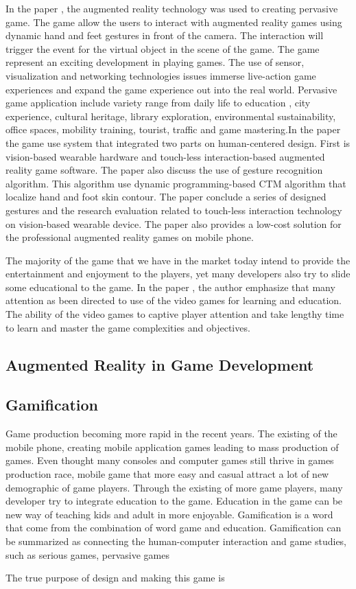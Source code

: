 \documentclass[12pt]{article}
\begin{document}
\par In the paper \cite{lv2015touch}, the augmented reality technology was used to creating pervasive game. The game allow the users to interact with augmented reality games using dynamic hand and feet gestures in front of the camera. The interaction will trigger the event for the virtual object in the scene of the game. The game represent an exciting development in playing games. The use of sensor, visualization and networking technologies issues immerse live-action game experiences and expand the game experience out into the real world. Pervasive game application include variety range from daily life to education , city experience, cultural heritage, library exploration, environmental sustainability, office spaces, mobility training, tourist, traffic and game mastering.In the paper the game use system that integrated two parts on human-centered design. First is vision-based wearable hardware and touch-less interaction-based augmented reality game software. The paper also discuss the use of gesture recognition algorithm. This algorithm use dynamic programming-based CTM algorithm that localize hand and foot skin contour.%
The paper conclude a series of designed gestures and the research evaluation related to touch-less interaction technology on vision-based wearable device. The paper also provides a low-cost solution for the professional augmented reality games on mobile phone.
\par The majority of the game that we have in the market today intend to provide the entertainment and enjoyment to the players, yet many developers also try to slide some educational to the game. In the paper \cite{dondlinger2007educational}, the author emphasize that many attention as been directed to use of the video games for learning and education. The ability of the video games to captive player attention and take lengthy time to learn and master the game complexities and objectives.

\subsection{Augmented Reality in Game Development}
\subsection{Gamification}
Game production becoming more rapid in the recent years. The existing of the mobile phone, creating mobile application games leading to mass production of games. Even thought many consoles and computer games still thrive in games production race, mobile game that more easy and casual attract a lot of new demographic of game players. Through the existing of more game players, many developer try to integrate education to the game. Education in the game can be new way of teaching kids and adult in more enjoyable. Gamification is a word that come from the combination of word game and education. Gamification \cite{deterding2011game} can be summarized as connecting the human-computer interaction and game studies, such as serious games, pervasive games
\par The true purpose of design and making this game is 
\end{document}
